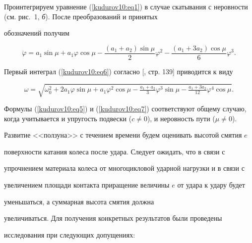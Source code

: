 Проинтегрируем уравнение (\ref{kudurov10:eq1}) в случае скатывания с неровности (см. рис.~1, \textsl{б}). После преобразований и принятых

обозначений получим

\begin{equation}

\label{kudurov10:eq6}

\ddot {\varphi}=a_1 \sin \mu + a_1 \varphi \cos \mu  - \frac{\left( a_1 + a_2 \right)\sin \mu }{2} \varphi

^2-\frac{\left( a_1 + 3a_2 \right)\cos \mu }{6}\varphi^3.

\end{equation}

Первый интеграл (\ref{kudurov10:eq6}) согласно [, стр. 139] приводится к виду

\begin{equation}

\label{kudurov10:eq7}

\omega =\sqrt {\omega_0^2 + 2a_1 \varphi \sin \mu + a_1 \varphi^2 \cos \mu - \tfrac{a_1 +a_2}{3}\varphi

^3\sin \mu -\tfrac{a_1 + 3a_2}{12} \varphi^4 \cos \mu}.

\end{equation}



Формулы (\ref{kudurov10:eq5}) и (\ref{kudurov10:eq7}) соответствуют общему случаю, когда учитывается и упругость подвески ($c\ne

0$), и неровность пути ($\mu \ne 0$).



Развитие <<ползуна>> с течением времени будем оценивать высотой смятия $e$

поверхности катания колеса после удара. Следует ожидать, что в связи с

упрочнением материала колеса от многоцикловой ударной нагрузки и в связи с

увеличением площади контакта приращение величины $e$ от удара к удару будет

уменьшаться, а суммарная высота смятия  должна

увеличиваться. Для получения конкретных результатов были проведены

исследования при следующих допущениях:

